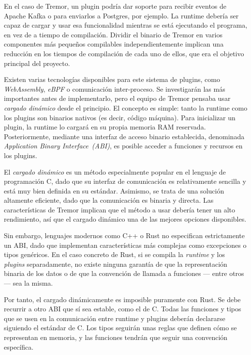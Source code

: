 En el caso de Tremor, un plugin podría dar soporte para recibir eventos de
Apache Kafka o para enviarlos a Postgres, por ejemplo. La runtime debería ser
capaz de cargar y usar esa funcionalidad mientras se está ejecutando el
programa, en vez de a tiempo de compilación. Dividir el binario de Tremor en
varios componentes más pequeños compilables independientemente implican una
reducción en los tiempos de compilación de cada uno de ellos, que era el
objetivo principal del proyecto.

Existen varias tecnologías disponibles para este sistema de plugins, como
\emph{WebAssembly}, \emph{eBPF} o comunicación inter-proceso. Se investigarán
las más importantes antes de implementarlo, pero el equipo de Tremor pensaba
usar \emph{cargado dinámico} desde el principio. El concepto es simple: tanto la
runtime como los plugins son binarios nativos (es decir, código máquina). Para
inicializar un plugin, la runtime lo cargará en su propia memoria RAM reservada.
Posteriormente, mediante una interfaz de acceso binario establecida, denominada
\emph{Application Binary Interface~(ABI)}, es posible acceder a funciones y
recursos en los plugins.

El \emph{cargado dinámico} es un método especialmente popular en el lenguaje de
programación C, dado que su interfaz de comunicación es relativamente sencilla y
está muy bien definida en su estándar. Asimismo, se trata de una solución
altamente eficiente, dado que la comunicación es binaria y directa. Las
características de Tremor implican que el método a usar debería tener un alto
rendimiento, así que el cargado dinámico una de las mejores opciones
disponibles.

Sin embargo, lenguajes modernos como C++ o Rust no especifican estrictamente un
ABI, dado que implementan características más complejas como excepciones o tipos
genéricos. En el caso concreto de Rust, si se compila la \emph{runtime} y los
\emph{plugins} separadamente, no existe ninguna garantía de que la
representación binaria de los datos o de que la convención de llamada a
funciones --- entre otros --- sea la misma.

Por tanto, el cargado dinámicamente es imposible puramente con Rust. Se debe
recurrir a otro ABI que sí sea estable, como el de C. Todas las funciones y
tipos que se usen en la comunicación entre runtime y plugins deberán declararse
siguiendo el estándar de C. Los tipos seguirán unas reglas que definen cómo se
representan en memoria, y las funciones tendrán que seguir una convención
específica.

